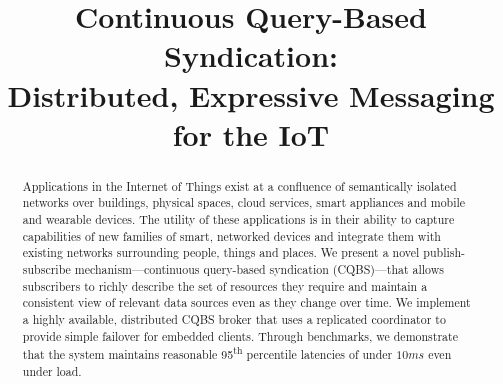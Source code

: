 \documentclass[conference]{IEEEtran}
\begin{document}
\title{Continuous Query-Based Syndication: \\ Distributed, Expressive Messaging for the IoT}

\author{
\and
{}
}

\maketitle

\begin{abstract}
Applications in the Internet of Things exist at a confluence of semantically isolated networks over buildings, physical spaces, cloud services, smart appliances and mobile and wearable devices.
The utility of these applications is in their ability to capture capabilities of new families of smart, networked devices and integrate them with existing networks surrounding people, things and places.
We present a novel publish-subscribe mechanism---continuous query-based syndication (CQBS)---that allows subscribers to richly describe the set of resources they require and maintain a consistent view of relevant data sources even as they change over time.
We implement a highly available, distributed CQBS broker that uses a replicated coordinator to provide simple failover for embedded clients.
Through benchmarks, we demonstrate that the system maintains reasonable 95\textsuperscript{th} percentile latencies of under $10ms$ even under load.
\end{abstract}















\end{document}
